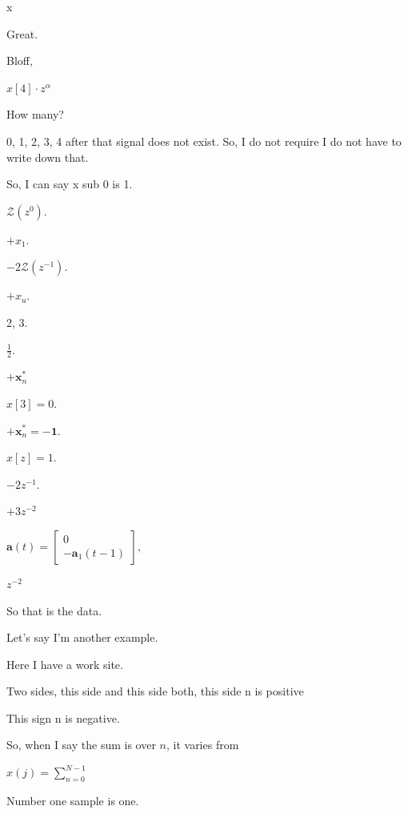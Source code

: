 \documentclass{article}
\begin{document}
x

Great.

Bloff,

$x[4] \cdot z^{\alpha}$

How many?

0, 1, 2, 3, 4 after that signal does not exist. So, I do not require I do not have to write down that.

So, I can say x sub 0 is 1.

$\mathcal{Z}(z^0)$.

$+ x_1$.

$- 2 \mathcal{Z}(z^{-1})$.

$+ x_u$.

2, 3.

$\frac{1}{2}$.

$+ \mathbf{x}_n^*$

$x[3] = 0$.

$+ \mathbf{x}_n^* = -\mathbf{1}$.

$x[z] = 1.$

$-2z^{-1}$.

$+3z^{-2}$

$\mathbf{a}(t) = \begin{bmatrix} 0 \\ -\mathbf{a}_1(t-1) \end{bmatrix},$

$z^{-2}$

So that is the data.

Let's say I'm another example.

Here I have a work site.

Two sides, this side and this side both, this side n is positive

This sign n is negative.



So, when I say the sum is over $n$, it varies from

$x(j) = \sum_{n=0}^{N-1}$

Number one sample is one.
\end{document}

